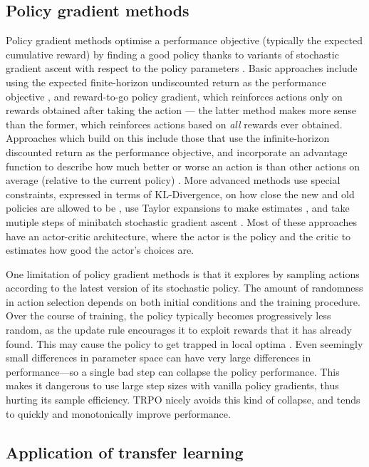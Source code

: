 \documentclass[12pt,a4paper]{article}
\begin{document}
\subsection{Policy gradient methods}
Policy gradient methods optimise a performance objective (typically the expected cumulative reward) by finding a good policy thanks to variants of stochastic gradient ascent with respect to the policy parameters \cite{DBLP:journals/corr/abs-1811-12560}. Basic approaches include using the expected finite-horizon undiscounted return as the performance objective \cite{}, and reward-to-go policy gradient, which reinforces actions only on rewards obtained after taking the action \cite{} --- the latter method makes more sense than the former, which reinforces actions based on \textit{all} rewards ever obtained. Approaches which build on this include those that use the infinite-horizon discounted return as the performance objective, and incorporate an advantage function to describe how much better or worse an action is than other actions on average (relative to the current policy) \cite{}. More advanced methods use special constraints, expressed in terms of KL-Divergence, on how close the new and old policies are allowed to be \cite{DBLP:journals/corr/SchulmanLMJA15}, use Taylor expansions to make estimates \cite{DBLP:journals/corr/SchulmanLMJA15}, and take mutiple steps of minibatch stochastic gradient ascent \cite{DBLP:journals/corr/SchulmanWDRK17}. Most of these approaches have an actor-critic architecture, where the actor is the policy and the critic to estimates how good the actor's choices are.

One limitation of policy gradient methods is that it explores by sampling actions according to the latest version of its stochastic policy. The amount of randomness in action selection depends on both initial conditions and the training procedure. Over the course of training, the policy typically becomes progressively less random, as the update rule encourages it to exploit rewards that it has already found. This may cause the policy to get trapped in local optima \cite{}. Even seemingly small differences in parameter space can have very large differences in performance—so a single bad step can collapse the policy performance. This makes it dangerous to use large step sizes with vanilla policy gradients, thus hurting its sample efficiency. TRPO nicely avoids this kind of collapse, and tends to quickly and monotonically improve performance.

\subsection{Application of transfer learning }
\end{document}
